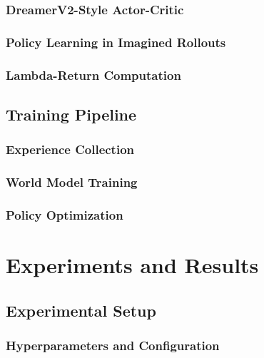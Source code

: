 \documentclass[
	english,
	ruledheaders=section,
	class=report,
	thesis={type=master},
	accentcolor=9c,
	custommargins=true,
	marginpar=false,
	parskip=half-,
	fontsize=11pt,
]{tudapub}
\begin{document}
\subsection{DreamerV2-Style Actor-Critic}
\label{subsec:dreamer_ac}

\subsection{Policy Learning in Imagined Rollouts}
\label{subsec:imagined_rollouts}

\subsection{Lambda-Return Computation}
\label{subsec:lambda_returns}

\section{Training Pipeline}
\label{sec:training_pipeline}

\subsection{Experience Collection}
\label{subsec:experience_collection}

\subsection{World Model Training}
\label{subsec:world_model_training}

\subsection{Policy Optimization}
\label{subsec:policy_optimization}

\chapter{Experiments and Results}
\label{chap:experiments}

\section{Experimental Setup}
\label{sec:exp_setup}

\subsection{Hyperparameters and Configuration}
\label{subsec:hyperparameters}
\end{document}
